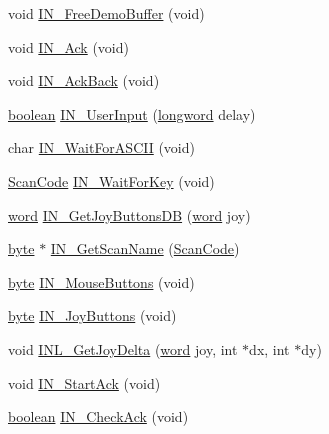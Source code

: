 \begin{DoxyCompactItemize}
void \hyperlink{ID__IN_8H_a2a8e23cfe91ef95b904e904df0bc9e11}{IN\_\-FreeDemoBuffer} (void)
\item 
void \hyperlink{ID__IN_8H_af72058fb29d783ff37069492273ff6d7}{IN\_\-Ack} (void)
\item 
void \hyperlink{ID__IN_8H_a81e23c614cbee763093d133f16e59ff7}{IN\_\-AckBack} (void)
\item 
\hyperlink{ID__HEAD_8H_a7c6368b321bd9acd0149b030bb8275ed}{boolean} \hyperlink{ID__IN_8H_a9f2f68f5b727261b95762dcef168de14}{IN\_\-UserInput} (\hyperlink{ID__HEAD_8H_a8a9a7dd50c6fdb45dcdf0eb929479663}{longword} delay)
\item 
char \hyperlink{ID__IN_8H_a6a8f9f185576515a4d238258440181a7}{IN\_\-WaitForASCII} (void)
\item 
\hyperlink{ID__IN_8H_a92ee9291fc7e992c1662c4e195242f2d}{ScanCode} \hyperlink{ID__IN_8H_a311d56c00631eb35b523f6c934900a7d}{IN\_\-WaitForKey} (void)
\item 
\hyperlink{ID__HEAD_8H_abad51e07ab6d26bec9f1f786c8d65bcd}{word} \hyperlink{ID__IN_8H_a18fd13dd18fda00b1415818795f117b4}{IN\_\-GetJoyButtonsDB} (\hyperlink{ID__HEAD_8H_abad51e07ab6d26bec9f1f786c8d65bcd}{word} joy)
\item 
\hyperlink{ID__HEAD_8H_a0c8186d9b9b7880309c27230bbb5e69d}{byte} $\ast$ \hyperlink{ID__IN_8H_a730756d76f67179d94d1a8ee90495a29}{IN\_\-GetScanName} (\hyperlink{ID__IN_8H_a92ee9291fc7e992c1662c4e195242f2d}{ScanCode})
\item 
\hyperlink{ID__HEAD_8H_a0c8186d9b9b7880309c27230bbb5e69d}{byte} \hyperlink{ID__IN_8H_a1dc32dd9a62a416001a9954a70dc4563}{IN\_\-MouseButtons} (void)
\item 
\hyperlink{ID__HEAD_8H_a0c8186d9b9b7880309c27230bbb5e69d}{byte} \hyperlink{ID__IN_8H_abc6dd93d0e7777cd67e20f61361f353d}{IN\_\-JoyButtons} (void)
\item 
void \hyperlink{ID__IN_8H_ad02d54392fab25e9c6e4208ba8c8baab}{INL\_\-GetJoyDelta} (\hyperlink{ID__HEAD_8H_abad51e07ab6d26bec9f1f786c8d65bcd}{word} joy, int $\ast$dx, int $\ast$dy)
\item 
void \hyperlink{ID__IN_8H_ac666b84a87364ddab589ceb0daaa129a}{IN\_\-StartAck} (void)
\item 
\hyperlink{ID__HEAD_8H_a7c6368b321bd9acd0149b030bb8275ed}{boolean} \hyperlink{ID__IN_8H_a50a122900022f7051ec64d5c4613ebcf}{IN\_\-CheckAck} (void)
\end{DoxyCompactItemize}
